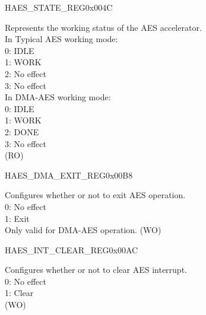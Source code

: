 \begin{register}{H}{AES\_STATE\_REG}{0x004C}\label{regdesc:AESSTATEREG}
%
%
\regnewline%
\begin{regdesc}\begin{reglist}
\item [AES\_STATE] Represents the working status of the AES accelerator. \\
In Typical AES working mode:\\
0: IDLE\\
1: WORK\\
2: No effect\\
3: No effect\\
In DMA-AES working mode:\\
0: IDLE\\
1: WORK\\
2: DONE\\
3: No effect\\
(RO) 
\end{reglist}\end{regdesc}
\end{register}


\begin{register}{H}{AES\_DMA\_EXIT\_REG}{0x00B8}\label{regdesc:AESDMAEXITREG}
%
%
\regnewline%
\begin{regdesc}\begin{reglist}
\item [AES\_DMA\_EXIT] Configures whether or not to exit AES operation. \\
0: No effect\\
1: Exit\\
Only valid for DMA-AES operation. (WO)
\end{reglist}\end{regdesc}
\end{register}


\begin{register}{H}{AES\_INT\_CLEAR\_REG}{0x00AC}\label{regdesc:AESINTCLEARREG}
%
%
\regnewline%
\begin{regdesc}\begin{reglist}
\item [AES\_INT\_CLEAR] Configures whether or not to clear AES interrupt. \\
0: No effect \\
1: Clear \\
(WO)
\end{reglist}\end{regdesc}
\end{register}


